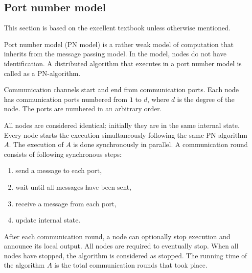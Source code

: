 




\subsection{Port number model} \label{sec:port_number_model}
This section is based on the excellent textbook \cite{HirvonenSuomelaDistAlg2020} unless otherwise mentioned.

Port number model (PN model) is a rather weak model of computation that inherits from the message passing model.
In the model, nodes do not have identification.
A distributed algorithm that executes in a port number model is called as a PN-algorithm.


Communication channels start and end from communication ports.
Each node has communication ports numbered from $1$ to $d$, where $d$ is the degree of the node.
The ports are numbered in an arbitrary order.

All nodes are considered identical; initially they are in the same internal state.
Every node starts the execution simultaneously following the same PN-algorithm $A$.
The execution of $A$ is done synchronously in parallel.
A communication round consists of following synchronous steps:
\begin{enumerate}
  \item send a message to each port,
  \item wait until all messages have been sent,
  \item receive a message from each port,
  \item update internal state.
\end{enumerate}
After each communication round, a node can optionally stop execution and announce its local output.
All nodes are required to eventually stop.
When all nodes have stopped, the algorithm is considered as stopped.
The running time of the algorithm $A$ is the total communication rounds that took place.


